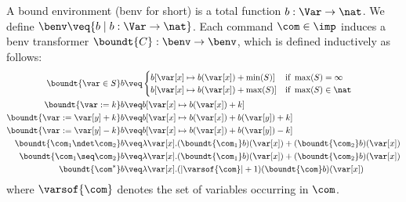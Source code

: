 \begin{definition}
  \label{de:boundenv}
  A bound environment (benv for short) is a total function \(b:\Var
  \to \nat\). We define \(\benv \veq \{ b \mid b:\Var \to \nat\}\).
  Each command \(\com\in \imp\) induces a benv transformer
  \(\boundt{C}:\benv \to \benv\), which is defined inductively as
  follows:
  \begin{align*}
    \boundt{\var \in S}b  
    & \veq 
    \begin{cases} 
      b[\var[x]\mapsto b(\var[x])+\min(S)]& \text{if }\max(S)=\infty\\
      b[\var[x]\mapsto b(\var[x])+\max(S)]& \text{if }\max(S)\in \nat
    \end{cases}
    \\
    \boundt{\var := k}b 
    & \veq  b[\var[x]\mapsto b(\var[x])+k]\\
    \boundt{\var := \var[y] + k}b
    & \veq  b[\var[x]\mapsto b(\var[x])+b(\var[y])+k]\\
    \boundt{\var := \var[y] - k}b
    & \veq  b[\var[x]\mapsto b(\var[x]) + b(\var[y]) - k]\\
    \boundt{\com_1 \ndet \com_2}b
    & \veq \lambda \var[x]. (\boundt{\com_1}b)(\var[x]) + (\boundt{\com_2}b)(\var[x])\\
    \boundt{\com_1 \seq \com_2}b
    & \veq \lambda \var[x]. (\boundt{\com_1}b)(\var[x]) + (\boundt{\com_2}b)(\var[x])\\
    \boundt{\com^*}b
    &\veq  \lambda \var[x]. (|\varsof{\com}|+1)(\boundt{\com}b)(\var[x])
  \end{align*}    
  where \(\varsof{\com}\) denotes the set of variables occurring
  in \(\com\).
\end{definition}

